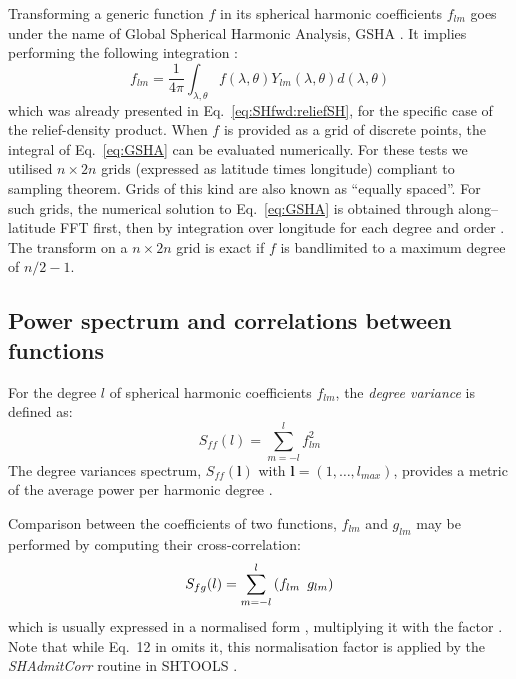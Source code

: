 Transforming a generic function $f$ in its spherical harmonic coefficients $f_{lm}$ goes under the name of Global Spherical Harmonic Analysis, GSHA \parencite{Sneeuw1994}.
It implies performing the following integration \parencite[Eq.~8 in][]{Wieczorek2007}:
\begin{equation}
    \label{eq:GSHA}
    f_{lm} =
    \frac{1}{4 \pi}
    \int_{\lambda, \theta}
    f(\lambda, \theta)
    Y_{lm}(\lambda, \theta) d(\lambda, \theta)
\end{equation}
which was already presented in Eq.~\ref{eq:SHfwd:reliefSH}, for the specific case of the relief-density product.
When $f$ is provided as a grid of discrete points, the integral of Eq.~\ref{eq:GSHA} can be evaluated numerically.
For these tests we utilised $n \times 2n$ grids (expressed as latitude times longitude) compliant to \textcite{Driscoll1994} sampling theorem.
Grids of this kind are also known as ``equally spaced''.
For such grids, the numerical solution to Eq.~\ref{eq:GSHA} is obtained through along--latitude FFT first, then by integration over longitude for each degree and order \parencites{Sneeuw1994}{Wieczorek2007}.
The transform on a $n \times 2n$ \textcite{Driscoll1994} grid is exact if $f$ is bandlimited to a maximum degree of $n/2 - 1$.

\subsection{Power spectrum and correlations between functions}
\label{ss:SigIs:Fwd:Spectrum}

For the degree $l$ of spherical harmonic coefficients $f_{lm}$, the \textit{degree variance} is defined as:
\begin{equation}
    \label{eq:DegVar}
    S_{ff}(l) = \sum_{m=-l}^{l} f_{lm}^2
\end{equation}
The degree variances spectrum, $S_{ff}(\bm{l})$ with $\bm{l} = (1, \dots, l_{max})$, provides a metric of the average power per harmonic degree \parencites{Rapp1982}{Wieczorek2007}{Hirt2015}.

Comparison between the coefficients of two functions, $f_{lm}$ and $g_{lm}$ may be performed by computing their cross-correlation:
\begin{equation}
    \label{eq:DegVarCross}
    S_{fg}(l) = \sum_{m=-l}^{l} \left( f_{lm} \enskip g_{lm} \right)
\end{equation}
which is usually expressed in a normalised form \parencites[e.g.][]{Phillips1980}{Rapp1982}{Rexer2016}, multiplying it with the factor .
Note that while Eq.~12 in \textcite{Wieczorek2007} omits it, this normalisation factor is applied by the \textit{SHAdmitCorr} routine in {SHTOOLS} \parencite{Wieczorek2018}.

